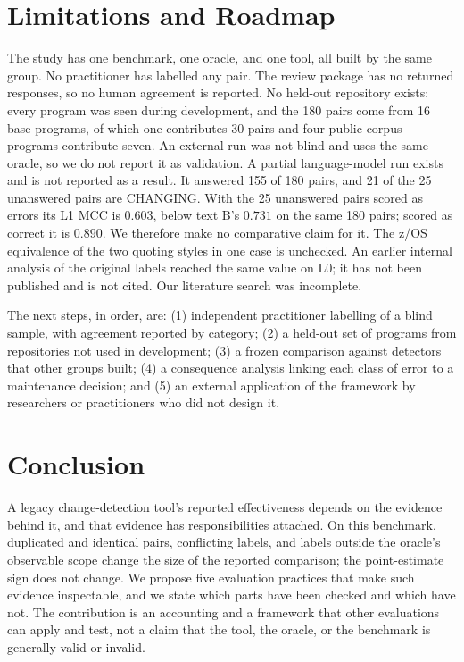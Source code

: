 \documentclass[conference]{IEEEtran}
\begin{document}
\section{Limitations and Roadmap}
\label{sec:limits}
The study has one benchmark, one oracle, and one tool, all built by the same group. No practitioner has labelled any pair. The review package has no returned responses, so no human agreement is reported. No held-out repository exists: every program was seen during development, and the 180 pairs come from 16 base programs, of which one contributes 30 pairs and four public corpus programs contribute seven. An external run was not blind and uses the same oracle, so we do not report it as validation. A partial language-model run exists and is not reported as a result. It answered 155 of 180 pairs, and 21 of the 25 unanswered pairs are CHANGING. With the 25 unanswered pairs scored as errors its L1 MCC is $0.603$, below text B's $0.731$ on the same 180 pairs; scored as correct it is $0.890$. We therefore make no comparative claim for it. The z/OS equivalence of the two quoting styles in one case is unchecked. An earlier internal analysis of the original labels reached the same value on L0; it has not been published and is not cited. Our literature search was incomplete.

The next steps, in order, are: (1) independent practitioner labelling of a blind sample, with agreement reported by category; (2) a held-out set of programs from repositories not used in development; (3) a frozen comparison against detectors that other groups built; (4) a consequence analysis linking each class of error to a maintenance decision; and (5) an external application of the framework by researchers or practitioners who did not design it.

\section{Conclusion}
A legacy change-detection tool's reported effectiveness depends on the evidence behind it, and that evidence has responsibilities attached. On this benchmark, duplicated and identical pairs, conflicting labels, and labels outside the oracle's observable scope change the size of the reported comparison; the point-estimate sign does not change. We propose five evaluation practices that make such evidence inspectable, and we state which parts have been checked and which have not. The contribution is an accounting and a framework that other evaluations can apply and test, not a claim that the tool, the oracle, or the benchmark is generally valid or invalid.



\end{document}
